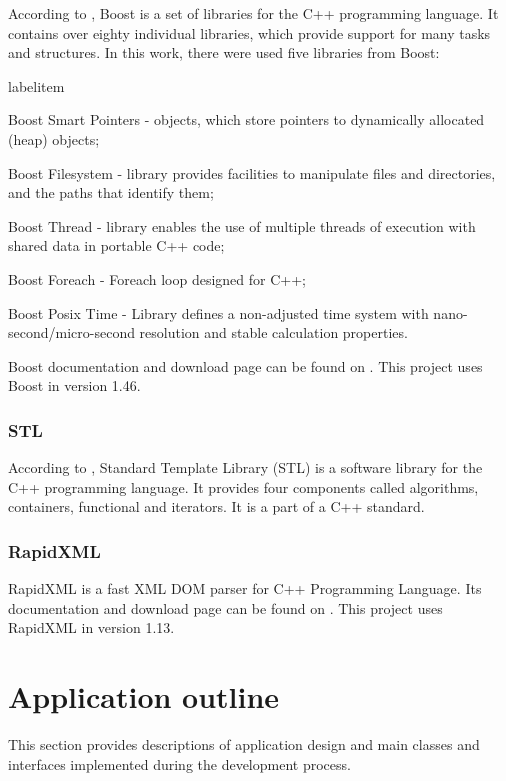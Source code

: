 \documentclass[a4paper,onecolumn,oneside,12pt]{memoir}
\makeatletter
\renewenvironment{itemize}{
  \begin{list}{  
  \csname labelitem\romannumeral\the\@listdepth\endcsname}{
  \setlength{\leftmargin}{1em}
	\setlength{\topsep}{6pt}%
	\setlength{\partopsep}{0pt}%
	\setlength{\parskip}{0pt}%
	\setlength{\parsep}{0pt}%
	\setlength{\itemsep}{0pt}}
}{
  \end{list}
}
\makeatother
\begin{document}
According to \cite{boostWiki}, Boost is a set of libraries for the C++ programming language. It 
contains over eighty individual libraries, which provide support for many tasks and structures.
In this work, there were used five libraries from Boost:
\begin{itemize}
  \item Boost Smart Pointers - objects, which store pointers to dynamically allocated (heap) objects;
  \item Boost Filesystem - library provides facilities to manipulate files and directories, and the
        paths that identify them;
  \item Boost Thread - library enables the use of multiple threads of execution with shared data in
        portable C++ code;
  \item Boost Foreach - Foreach loop designed for C++;
  \item Boost Posix Time - Library defines a non-adjusted time system with nano-second/micro-second
        resolution and stable calculation properties.
\end{itemize}

Boost documentation and download page can be found on \cite{boostMainPage}. This project uses Boost
in version 1.46.

\subsubsection{STL}

According to \cite{stlWiki}, Standard Template Library (STL) is a software library for the C++
programming language. It provides four components called algorithms, containers, functional and
iterators. It is a part of a C++ standard.

\subsubsection{RapidXML}

RapidXML is a fast XML DOM parser for C++ Programming Language. Its documentation and download page
can be found on \cite{rapidXmlMainPage}. This project uses RapidXML in version 1.13.

\section{Application outline}

This section provides descriptions of application design and main classes and interfaces implemented
during the development process.
\end{document}
